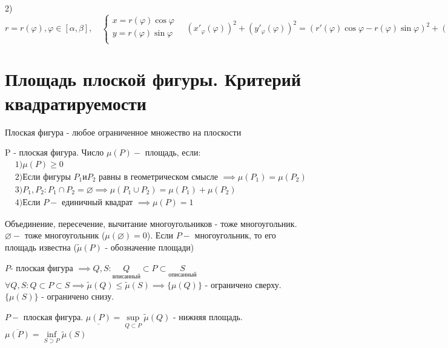 \documentclass[../main.tex]{subfiles}
\begin{document}
 2)$r=r(\varphi), \varphi \in [\alpha,\beta], \quad \begin{cases}
    x=r(\varphi)\cos{\varphi}\\ 
    y=r(\varphi)\sin{\varphi}\\ 
\end{cases}\quad (x'_{\varphi}(\varphi))^{2}+(y'_{\varphi}(\varphi))^{2}=(r'(\varphi)\cos{\varphi}-r(\varphi)\sin{\varphi})^{2}+(r'(\varphi)\sin{\varphi}+r(\varphi)\cos{\varphi})^{2}=r^{2}(\varphi)+(r'(\varphi))^{2}\implies l(L) = \int\limits_{\alpha}^{\beta}\sqrt{r^{2}(\varphi)+(r'(\varphi))^{2}} $
\section{Площадь плоской фигуры. Критерий квадратируемости}
\begin{definition}
    Плоская фигура - любое ограниченное множество на плоскости
\end{definition}
\begin{definition}
    P - плоская фигура. Число $\mu(P)- $ площадь, если: \\
    $\begin{aligned} &1) \mu(P)\geqslant 0
    \\&2) \text{Если фигуры } P_{1} и P_{2} \text{ равны в геометрическом смысле }\implies \mu(P_{1})=\mu(P_{2})
    \\&3)P_{1},P_{2}: P_{1} \cap P_{2} =\varnothing  \implies\mu(P_{1} \cup P_{2})=\mu(P_{1})+\mu(P_{2})
    \\&4) \text{Если } P- \text{ единичный квадрат } \implies \mu(P)=1\end{aligned}$
\end{definition}
\vspace{1cm}
\noindent Объединение, пересечение, вычитание многоугольников - тоже многоугольник. \\$\varnothing  -$ тоже многоугольник ($\mu(\varnothing )=0$). Если $P-$ многоугольник, то его площадь известна ($\tilde{\mu}(P)$ - обозначение площади)

$P$- плоская фигура $\implies Q, S : \underset{вписанный}{Q}\subset P \subset \underset{описанный}{S}$
\\$\forall Q,S : Q\subset P \subset S \implies \tilde{\mu}(Q) \leqslant \tilde{\mu}(S)\implies \{\mu(Q)\}$ - ограничено сверху. $\{\mu(S)\}$ - ограничено снизу.

\begin{definition}
    $ P-$ плоская фигура. $\underline{\mu(P)}=\underset{Q \subset P }{\sup}{\tilde{\mu}(Q)}$ - нижняя площадь. $\overline{\mu(P)}=\underset{S\supset P}{\inf}{\tilde{\mu}(S)}$
\end{definition}
\end{document}
